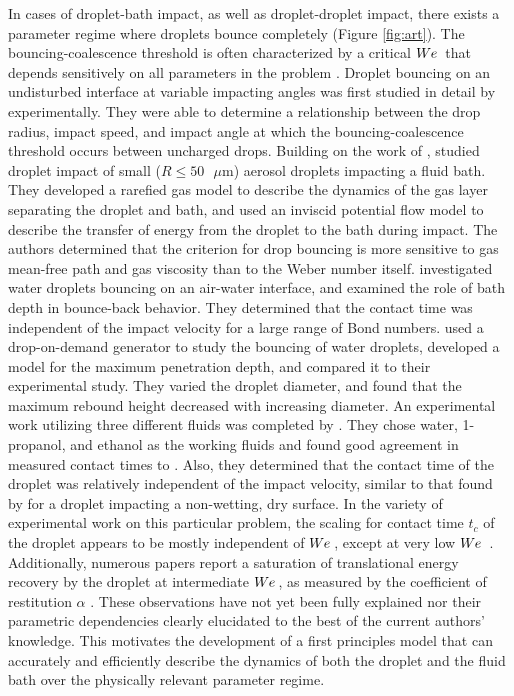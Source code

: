 \documentclass{jfm}
\begin{document}
\hspace*{1em} In cases of droplet-bath impact, as well as droplet-droplet impact, there exists a parameter regime where droplets bounce completely (Figure \ref{fig:art}).  The bouncing-coalescence threshold is often characterized by a critical $W\kern-0.03em e\,$ that depends sensitively on all parameters in the problem \citep{tang2019bouncing}.  Droplet bouncing on an undisturbed interface at variable impacting angles was first studied in detail by \cite{jayaratne1964coalescence} experimentally. They were able to determine a relationship between the drop radius, impact speed, and impact angle at which the bouncing-coalescence threshold occurs between uncharged drops. 
Building on the work of \cite{gopinath2001dynamics}, \cite{bach2004coalescence} studied droplet impact of small ($ R \leq 50 \text{ } \mu\mathrm{m}$) aerosol droplets impacting a fluid bath. They developed a rarefied gas model to describe the dynamics of the gas layer separating the droplet and bath, and used an inviscid potential flow model to describe the transfer of energy from the droplet to the bath during impact. The authors determined that the criterion for drop bouncing is more sensitive to gas mean-free path and gas viscosity than to the Weber number itself. \cite{zou2011experimental} investigated water droplets bouncing on an air-water interface, and examined the role of bath depth in bounce-back behavior. They determined that the contact time was independent of the impact velocity for a large range of Bond numbers. \cite{wu2020small} used a drop-on-demand generator to study the bouncing of water droplets, developed a model for the maximum penetration depth, and compared it to their experimental study. They varied the droplet diameter, and found that the maximum rebound height decreased with increasing diameter.  An experimental work utilizing three different fluids was completed by \cite{zhao2011transition}. They chose water, 1-propanol, and ethanol as the working fluids and found good agreement in measured contact times to \cite{jayaratne1964coalescence}. Also, they determined that the contact time of the droplet was relatively independent of the impact velocity, similar to that found by \cite{richard2002contact} for a droplet impacting a non-wetting, dry surface. In the variety of experimental work on this particular problem, the scaling for contact time $t_c$ of the droplet appears to be mostly independent of $W\kern-0.03em e\,$, except at very low $W\kern-0.03em e\,$ \citep{zhao2011transition,zou2011experimental,wu2020small}. Additionally, numerous papers report a saturation of translational energy recovery by the droplet at intermediate $W\kern-0.03em e\,$, as measured by the coefficient of restitution $\alpha$ \citep{jayaratne1964coalescence,bach2004coalescence,zhao2011transition,zou2011experimental,wu2020small}. These observations have not yet been fully explained nor their parametric dependencies clearly elucidated to the best of the current authors' knowledge. This motivates the development of a first principles model that can accurately and efficiently describe the dynamics of both the droplet and the fluid bath over the physically relevant parameter regime. \\
\end{document}
